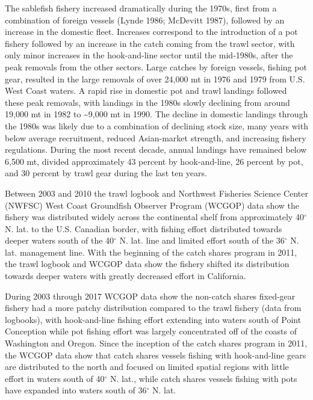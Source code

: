 \documentclass[
]{scrartcl}
\begin{document}
The sablefish fishery increased dramatically during the 1970s, first
from a combination of foreign vessels (Lynde 1986; McDevitt 1987),
followed by an increase in the domestic fleet. Increases correspond to
the introduction of a pot fishery followed by an increase in the catch
coming from the trawl sector, with only minor increases in the
hook-and-line sector until the mid-1980s, after the peak removals from
the other sectors. Large catches by foreign vessels, fishing pot gear,
resulted in the large removals of over 24,000 mt in 1976 and 1979 from
U.S. West Coast waters. A rapid rise in domestic pot and trawl landings
followed these peak removals, with landings in the 1980s slowly
declining from around 19,000 mt in 1982 to \textasciitilde9,000 mt in
1990. The decline in domestic landings through the 1980s was likely due
to a combination of declining stock size, many years with below average
recruitment, reduced Asian-market strength, and increasing fishery
regulations. During the most recent decade, annual landings have
remained below 6,500 mt, divided approximately 43 percent by
hook-and-line, 26 percent by pot, and 30 percent by trawl gear during
the last ten years.

Between 2003 and 2010 the trawl logbook and Northwest Fisheries Science
Center (NWFSC) West Coast Groundfish Observer Program (WCGOP) data show
the fishery was distributed widely across the continental shelf from
approximately 40\(^{\circ}\) N. lat. to the U.S. Canadian border, with
fishing effort distributed towards deeper waters south of the
40\(^{\circ}\) N. lat. line and limited effort south of the
36\(^{\circ}\) N. lat. management line. With the beginning of the catch
shares program in 2011, the trawl logbook and WCGOP data show the
fishery shifted its distribution towards deeper waters with greatly
decreased effort in California.

During 2003 through 2017 WCGOP data show the non-catch shares fixed-gear
fishery had a more patchy distribution compared to the trawl fishery
(data from logbooks), with hook-and-line fishing effort extending into
waters south of Point Conception while pot fishing effort was largely
concentrated off of the coasts of Washington and Oregon. Since the
inception of the catch shares program in 2011, the WCGOP data show that
catch shares vessels fishing with hook-and-line gears are distributed to
the north and focused on limited spatial regions with little effort in
waters south of 40\(^{\circ}\) N. lat., while catch shares vessels
fishing with pots have expanded into waters south of 36\(^{\circ}\) N.
lat.
\end{document}
